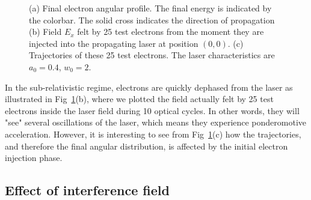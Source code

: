\begin{figure}[H]
\begin{center}
\end{center}
\caption{\label{fig:effectInterferenceSubRelativistic}(a) Final electron angular profile. The final energy is indicated by the colorbar. The solid cross indicates the direction of propagation (b) Field $E_x$ felt by 25 test electrons from the moment they are injected into the propagating laser at position $(0,0)$. (c) Trajectories of these 25 test electrons. The laser characteristics are $a_0 = 0.4$, $w_0 = 2$. }
\end{figure}

In the sub-relativistic regime, electrons are quickly dephased from the laser as illustrated in Fig~\ref{fig:effectInterferenceSubRelativistic}(b), where we plotted the field actually felt by 25 test electrons inside the laser field during 10 optical cycles. In other words, they will "see" several oscillations of the laser, which means they experience ponderomotive acceleration. However, it is interesting to see from Fig~\ref{fig:effectInterferenceSubRelativistic}(c) how the trajectories, and therefore the final angular distribution, is affected by the initial electron injection phase. 




\subsection{Effect of interference field}\label{subsection:Effet of interference field}

